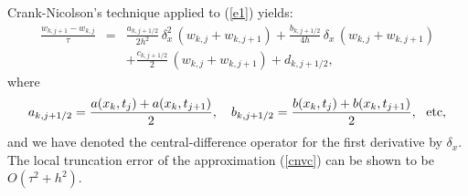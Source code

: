 Crank-Nicolson's technique applied to (\ref{e1}) yields:
\begin{eqnarray}
\frac{w_{k,j+1}-w_{k,j}}{\tau} &=& \frac{a_{k,j+1/2}}{2h^{2}} \,
\delta_{x}^2 \, \left(w_{k,j}+w_{k,j+1}\right)
+\frac{b_{k,j+1/2}}{4h} \, \delta_{x} \,  \left(w_{k,j}+w_{k,j+1}\right)\nonumber \\
&&+\frac{c_{k,j+1/2}}{2} \, \left(w_{k,j}+w_{k,j+1}\right)+d_{k,j+1/2}, \label{cnvc}
\end{eqnarray}
where
\[
a_{k,j+1/2}=\frac{a(x_{k},t_{j})+a(x_{k},t_{j+1})}{2}, \quad
b_{k,j+1/2}=\frac{b(x_{k},t_{j})+b(x_{k},t_{j+1})}{2}, \ \ {\rm etc,}
\]
and we have denoted the central-difference operator for the first derivative by 
$\delta_{x}$.
The local truncation error of the approximation (\ref{cnvc}) can be shown to be
$O(\tau^2+h^2)$.
 

